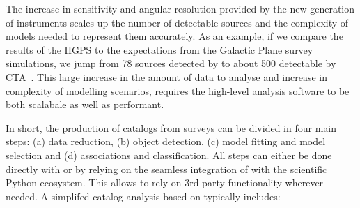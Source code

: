 \documentclass[longauth]{aa}
\begin{document}
The increase in sensitivity and angular resolution provided by the new generation of
instruments scales up the number of detectable sources and the complexity of 
models needed to represent them accurately. As an example, if we compare the
results of the HGPS to the expectations from the \cta Galactic Plane survey
simulations, we jump from 78 sources detected by \hess to about 500 detectable by
CTA~\citep{Remy2021}. This large increase in the amount of data to analyse
and increase in complexity of modelling scenarios, requires the high-level
analysis software to be both scalabale as well as performant. 

In short, the production of catalogs from \gammaray surveys can be divided in
four main steps: (a) data reduction, (b) object detection, (c) model fitting and model
selection and (d) associations and classification. All steps can either be done directly
with \gammapy or by relying on the seamless integration of \gammapy with the
scientific Python ecosystem. This allows to rely on 3rd party functionality
wherever needed. A simplifed catalog analysis based on \gammapy typically includes:
\end{document}
